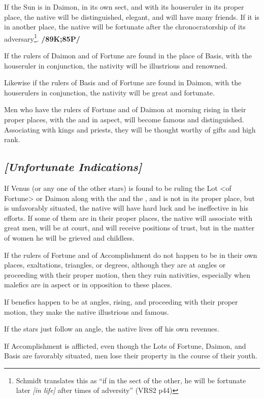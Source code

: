 If the Sun is in Daimon, in its own sect, and with its houseruler in its proper place, the native will be distinguished, elegant, and will have many friends. If it is in another place, the native will be fortunate after the chronocratorship of its adversary\footnote{Schmidt translates this as ``if in the sect of the other, he will be fortunate later \textsl{[in life]} after times of adversity'' (VRS2 p44)}. \textbf{/89K;85P/}

If the rulers of Daimon and of Fortune are found in the place of Basis, with the houseruler in conjunction, the nativity will be illustrious and renowned. 

Likewise if the rulers of Basis and of Fortune are found in Daimon, with the houserulers in conjunction, the nativity will be great and fortunate. 

Men who have the rulers of Fortune and of Daimon at morning rising in their proper places, with the \Sun\xspace and \Moon\xspace in aspect, will become famous and distinguished. Associating with kings and priests, they will be thought worthy of gifts and high rank. 

\subsection{\textit{[Unfortunate Indications]}}
If Venus (or any one of the other stars) is found to be ruling the Lot <of Fortune> or Daimon along with the \Sun\xspace and the \Moon, and is not in its proper place, but is unfavorably situated, the native will have hard luck and be ineffective in his efforts. If some of them are in their proper places, the native will associate with great men, will be at court, and will receive positions of trust, but in the matter of women he will be grieved and childless.

If the rulers of Fortune and of Accomplishment  do not happen to be in their own places, exaltations, triangles, or degrees, although they are at angles or proceeding with their proper motion, then they ruin nativities, especially when malefics are in aspect or in opposition to these places. 

If benefics happen to be at angles, rising, and proceeding with their proper motion, they make the native illustrious and famous. 

If the stars just follow an angle, the native lives off his own revenues.

If Accomplishment is afflicted, even though the Lots of Fortune, Daimon, and Basis are favorably situated, men lose their property in the course of their youth. 

